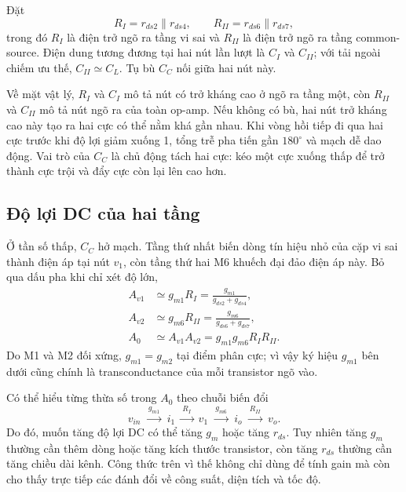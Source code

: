 \documentclass[11pt,a4paper]{report}
\newcommand{\ang}[1]{\ensuremath{#1^{\circ}}}
\begin{document}
Đặt
\begin{equation}
R_I=r_{ds2}\parallel r_{ds4},\qquad
R_{II}=r_{ds6}\parallel r_{ds7},
\end{equation}
trong đó $R_I$ là điện trở ngõ ra tầng vi sai và $R_{II}$ là điện trở ngõ ra
tầng common-source. Điện dung tương đương tại hai nút lần lượt là $C_I$ và
$C_{II}$; với tải ngoài chiếm ưu thế, $C_{II}\simeq C_L$. Tụ bù $C_C$ nối giữa
hai nút này.

Về mặt vật lý, $R_I$ và $C_I$ mô tả nút có trở kháng cao ở ngõ ra tầng một,
còn $R_{II}$ và $C_{II}$ mô tả nút ngõ ra của toàn op-amp. Nếu không có bù,
hai nút trở kháng cao này tạo ra hai cực có thể nằm khá gần nhau. Khi vòng hồi
tiếp đi qua hai cực trước khi độ lợi giảm xuống 1, tổng trễ pha tiến gần
\ang{180} và mạch dễ dao động. Vai trò của $C_C$ là chủ động tách hai cực:
kéo một cực xuống thấp để trở thành cực trội và đẩy cực còn lại lên cao hơn.

\subsection{Độ lợi DC của hai tầng}
Ở tần số thấp, $C_C$ hở mạch. Tầng thứ nhất biến dòng tín hiệu nhỏ của cặp vi
sai thành điện áp tại nút $v_1$, còn tầng thứ hai M6 khuếch đại đảo điện áp này.
Bỏ qua dấu pha khi chỉ xét độ lớn,
\begin{align}
A_{v1}&\simeq g_{m1}R_I
=\frac{g_{m1}}{g_{ds2}+g_{ds4}},\\
A_{v2}&\simeq g_{m6}R_{II}
=\frac{g_{m6}}{g_{ds6}+g_{ds7}},\\
A_0&\simeq A_{v1}A_{v2}
=g_{m1}g_{m6}R_IR_{II}.
\end{align}
Do M1 và M2 đối xứng, $g_{m1}=g_{m2}$ tại điểm phân cực; vì vậy ký hiệu
$g_{m1}$ bên dưới cũng chính là transconductance của mỗi transistor ngõ vào.

Có thể hiểu từng thừa số trong $A_0$ theo chuỗi biến đổi
\begin{equation}
v_{in}\ \xrightarrow{\ g_{m1}\ }\ i_1
\ \xrightarrow{\ R_I\ }\ v_1
\ \xrightarrow{\ g_{m6}\ }\ i_o
\ \xrightarrow{\ R_{II}\ }\ v_o.
\end{equation}
Do đó, muốn tăng độ lợi DC có thể tăng $g_m$ hoặc tăng $r_{ds}$. Tuy nhiên tăng
$g_m$ thường cần thêm dòng hoặc tăng kích thước transistor, còn tăng $r_{ds}$
thường cần tăng chiều dài kênh. Công thức trên vì thế không chỉ dùng để tính
gain mà còn cho thấy trực tiếp các đánh đổi về công suất, diện tích và tốc độ.
\end{document}
